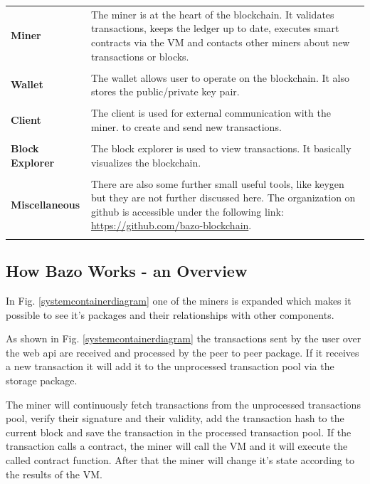 \begin{tabular}[t]{ p{3cm} p{12.5cm}}
\textbf{Miner} &
The miner is at the heart of the blockchain. It validates transactions, keeps the ledger up to date, executes smart contracts via the VM and contacts other miners about new transactions or blocks. \\ \\
 
\raggedright
\textbf{Wallet} &
The wallet allows user to operate on the blockchain. It also stores the public/private key pair. \cite{ba_wallet} \\ \\
 
\textbf{Client} &
The client is used for external communication with the miner. to create and send new transactions. \\ \\

\raggedright
\textbf{Block Explorer} & 
The block explorer is used to view transactions. It basically visualizes the blockchain. \\ \\

\raggedright
\textbf{Miscellaneous} & 
There are also some further small useful tools, like keygen but they are not further discussed here. The organization on github is accessible under the following link: \href{https://github.com/bazo-blockchain}{https://github.com/bazo-blockchain}. \\ \\
\end{tabular}

\subsection{How Bazo Works - an Overview}
In Fig. \ref{systemcontainerdiagram} one of the miners is expanded which makes it possible to see it's packages and their relationships with other components. 

As shown in Fig. \ref{systemcontainerdiagram} the transactions sent by the user over the web api are received and processed by the peer to peer package. If it receives a new transaction it will add it to the unprocessed transaction pool via the storage package. 

The miner will continuously fetch transactions from the unprocessed transactions pool, verify their signature and their validity, add the transaction hash to the current block and save the transaction in the processed transaction pool. If the transaction calls a contract, the miner will call the VM and it will execute the called contract function. After that the miner will change it's state according to the results of the VM.

